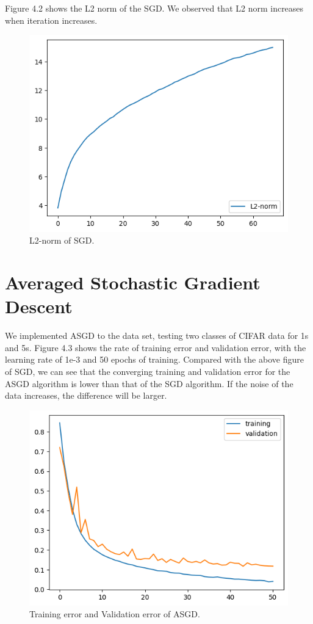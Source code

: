 Figure 4.2 shows the L2 norm of the SGD. We observed that L2 norm increases when iteration increases.

\begin{figure}[H]
    \centering %
        \includegraphics[width=0.6\linewidth]{./SGDl2.png} 
    \caption{L2-norm of SGD.}
\end{figure}

\section{Averaged Stochastic Gradient Descent}

We implemented ASGD to the data set, testing two classes of CIFAR data for 1s and 5s. Figure 4.3 shows the rate of training error and validation error, with the learning rate of 1e-3 and 50 epochs of training. Compared with the above figure of SGD, we can see that the converging training and validation error for the ASGD algorithm is lower than that of the SGD algorithm. If the noise of the data increases, the difference will be larger.

\begin{figure}[H]
    \centering %
        \includegraphics[width=0.6\linewidth]{./ASGD.png} 
    \caption{Training error and Validation error of ASGD.}
\end{figure}

